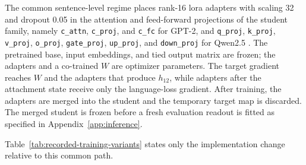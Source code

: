 The common sentence-level regime places rank-16 \ac{lora} adapters with scaling 32 and dropout 0.05 in the attention and feed-forward projections of the student family, namely \texttt{c\_attn}, \texttt{c\_proj}, and \texttt{c\_fc} for GPT-2, and \texttt{q\_proj}, \texttt{k\_proj}, \texttt{v\_proj}, \texttt{o\_proj}, \texttt{gate\_proj}, \texttt{up\_proj}, and \texttt{down\_proj} for Qwen2.5 \autocite{hu2022}. 
The pretrained base, input embeddings, and tied output matrix are frozen; the adapters and a co-trained \(W\) are optimizer parameters.
The target gradient reaches \(W\) and the adapters that produce \(h_{12}\), while adapters after the attachment state receive only the language-loss gradient.
After training, the adapters are merged into the student and the temporary target map is discarded.
The merged student is frozen before a fresh evaluation readout is fitted as specified in Appendix~\ref{app:inference}. 

Table~\ref{tab:recorded-training-variants} states only the implementation change relative to this common path.

